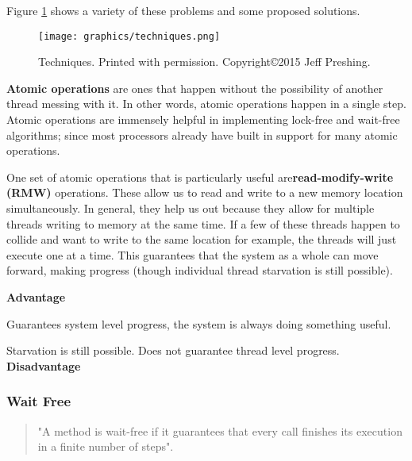 \documentclass[letterpaper, 12pt]{article}
\begin{document}
Figure \ref{techniques} shows a variety of these problems and some proposed solutions.
\begin{figure}
  \centering
  \texttt{[image: graphics/techniques.png]}
  \caption{Techniques. Printed with permission. Copyright\copyright 2015 Jeff Preshing.\cite{introlockfree}}
  \label{techniques}
\end{figure} 
\newpage

{\bfseries Atomic operations} are ones that happen without the possibility of another thread 
messing with it. In other words, atomic operations happen in a single step. Atomic operations 
are immensely helpful in implementing lock-free and wait-free algorithms; since most 
processors already have built in support for many atomic operations. 
\par\vspace{\baselineskip}

One set of atomic operations that is particularly useful are{\bfseries read-modify-write (RMW)} 
operations. These allow us to read and write to a new memory location simultaneously. In general, 
they help us out because they allow for multiple threads writing to memory at the same time. 
If a few of these threads happen to collide and want to write to the same location for example, 
the threads will just execute one at a time. This guarantees that the system as a whole can move 
forward, making progress (though individual thread starvation is still possible).  
\par\vspace{\baselineskip}


{\bfseries Advantage} \par\vspace{\baselineskip}
Guarantees system level progress, the system is always doing something useful.
\par\vspace{\baselineskip}


\par\vspace{\baselineskip}
Starvation is still possible. Does not guarantee thread level progress. 
{\bfseries Disadvantage} 

\subsubsection{Wait Free}
\begin{quotation}
	"A method is wait-free if it guarantees that every call finishes its execution
	in a finite number of steps"\citep[p. 59]{artofmulti}.
\end{quotation}
\end{document}
